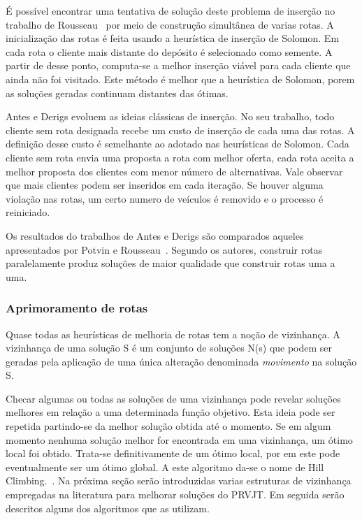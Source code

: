 É possível encontrar uma tentativa de solução deste problema de inserção no trabalho de Rousseau~\cite{Rousseau} por meio de construção simultânea de varias rotas. A inicialização das rotas é feita usando a heurística de inserção de Solomon.  Em cada rota o cliente mais distante do depósito é selecionado como semente.  A partir de desse ponto, computa-se a melhor inserção viável para cada cliente que ainda não foi visitado. Este método é melhor que a heurística de Solomon, porem as soluções geradas continuam distantes das ótimas.

Antes  e  Derigs \cite{Derigs} evoluem as ideias clássicas de inserção. No seu trabalho, todo cliente sem rota designada recebe um custo de inserção de cada uma das rotas. A definição
desse custo é semelhante ao adotado nas heurísticas de Solomon.  Cada cliente sem rota
envia uma proposta a rota com melhor oferta, cada rota aceita a melhor proposta dos
clientes com menor número de alternativas.  Vale observar que mais clientes podem ser
inseridos em cada iteração.  Se houver alguma violação nas rotas,  um certo numero de
veículos é removido e o processo é reiniciado. 

Os resultados do trabalhos de Antes e Derigs \cite{Derigs} são comparados aqueles apresentados por Potvin e Rousseau~\cite{Rousseau}. Segundo os autores, construir rotas paralelamente produz soluções de maior qualidade que construir rotas uma a uma.


\subsubsection{Aprimoramento de rotas}

Quase todas as heurísticas de melhoria de rotas tem a noção de vizinhança. A vizinhança de uma solução S é um conjunto de soluções N(s) que podem ser geradas pela aplicação de uma única alteração denominada \textit{movimento} na solução S.

Checar algumas ou todas as soluções de uma vizinhança pode revelar soluções melhores em relação a uma determinada função objetivo. Esta ideia pode ser repetida partindo-se da melhor solução obtida até o momento. Se em algum momento nenhuma solução melhor for encontrada em uma vizinhança, um ótimo local foi obtido.  Trata-se definitivamente de um ótimo local, por em este pode eventualmente ser um ótimo global.  A este algoritmo da-se o nome de Hill Climbing.~\cite{Gendreau}.
Na próxima seção serão introduzidas varias estruturas de vizinhança empregadas na literatura para melhorar soluções do PRVJT. Em seguida serão descritos alguns dos algoritmos que as utilizam.

